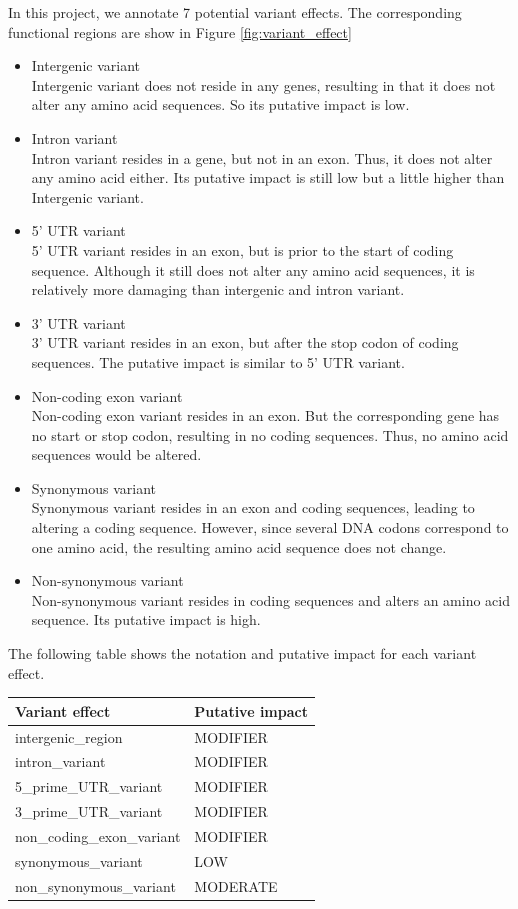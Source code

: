 \documentclass[onehalf,11pt]{beavtex}
\begin{document}
In this project, we annotate 7 potential variant effects. The corresponding functional regions are show in Figure \ref{fig:variant_effect}
\begin{itemize}
  \item Intergenic variant \\
  Intergenic variant does not reside in any genes, resulting in that it does not alter any amino acid sequences. So its putative impact is low. 
  \item Intron variant \\
  Intron variant resides in a gene, but not in an exon. Thus, it does not alter any amino acid either. Its putative impact is still low but a little higher than Intergenic variant.
  \item 5' UTR variant \\
  5' UTR variant resides in an exon, but is prior to the start of coding sequence. Although it still does not alter any amino acid sequences, it is relatively more damaging than intergenic and intron variant.
  \item 3' UTR variant \\
  3' UTR variant resides in an exon, but after the stop codon of coding sequences. The putative impact is similar to 5' UTR variant.
  \item Non-coding exon variant \\
  Non-coding exon variant resides in an exon. But the corresponding gene has no start or stop codon, resulting in no coding sequences. Thus, no amino acid sequences would be altered.
  \item Synonymous variant \\
  Synonymous variant resides in an exon and coding sequences, leading to altering a coding sequence. However, since several DNA codons correspond to one amino acid, the resulting amino acid sequence does not change.
  \item Non-synonymous variant \\
  Non-synonymous variant resides in coding sequences and alters an amino acid sequence. Its putative impact is high.
\end{itemize}

The following table shows the notation and putative impact for each variant effect.


\begin{table}[H]
\centering
\begin{tabular}{l| l}
\hline
Variant effect & Putative impact \\
\hline
  intergenic\_region & MODIFIER \\
  intron\_variant & MODIFIER \\
  5\_prime\_UTR\_variant & MODIFIER \\
  3\_prime\_UTR\_variant & MODIFIER \\
  non\_coding\_exon\_variant & MODIFIER \\
  synonymous\_variant & LOW \\
  non\_synonymous\_variant & MODERATE \\

\end{tabular}
\end{table}
\end{document}
